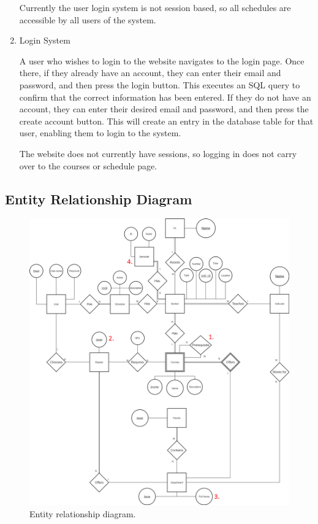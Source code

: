 \documentclass[twoside=false,a4paper,11pt]{article}
\theoremstyle{mytheor}
\begin{document}
\begin{enumerate}
	Currently the user login system is not session based, so all schedules are accessible by all users of the system.

	\item Login System

	A user who wishes to login to the website navigates to the login page. Once there, if they already have an account, they can enter their email and password, and then press the login button. This executes an SQL query to confirm that the correct information has been entered. If they do not have an account, they can enter their desired email and password, and then press the create account button. This will create an entry in the database table for that user, enabling them to login to the system.

	The website does not currently have sessions, so logging in does not carry over to the courses or schedule page. 

\end{enumerate}

\subsection*{Entity Relationship Diagram}

\begin{figure}[h!]
	\includegraphics[width=\textwidth]{ERDiagram.png} 
	\caption{Entity relationship diagram.}
\end{figure}
\end{document}
